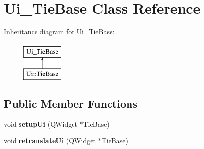 \hypertarget{class_ui___tie_base}{}\section{Ui\+\_\+\+Tie\+Base Class Reference}
\label{class_ui___tie_base}
Inheritance diagram for Ui\+\_\+\+Tie\+Base\+:\begin{figure}[H]
\begin{center}
\leavevmode
\includegraphics[height=2.000000cm]{class_ui___tie_base}
\end{center}
\end{figure}
\subsection*{Public Member Functions}
\begin{DoxyCompactItemize}
\item 
\mbox{\label{class_ui___tie_base_a82848b8bdea34884e30dedf186456fbb}} 
void {\bfseries setup\+Ui} (Q\+Widget $\ast$Tie\+Base)
\item 
\mbox{\label{class_ui___tie_base_a8fde32edeed72b21f757678a67125976}} 
void {\bfseries retranslate\+Ui} (Q\+Widget $\ast$Tie\+Base)
\end{DoxyCompactItemize}
